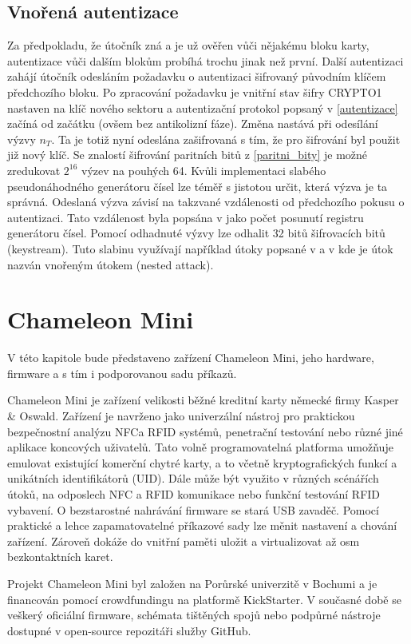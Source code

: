 \section{Vnořená autentizace}
Za předpokladu, že útočník zná a je už ověřen vůči nějakému bloku karty, autentizace vůči dalším blokům probíhá trochu jinak než první. Další autentizaci zahájí útočník odesláním požadavku o autentizaci šifrovaný původním klíčem předchozího bloku. Po zpracování požadavku je vnitřní stav šifry CRYPTO1 nastaven na klíč nového sektoru a autentizační protokol popsaný v \ref{autentizace} začíná od začátku (ovšem bez antikolizní fáze). Změna nastává při odesílání výzvy $n_T$. Ta je totiž nyní odeslána zašifrovaná s tím, že pro šifrování byl použit již nový klíč. Se znalostí šifrování paritních bitů z \ref{paritni_bity} je možné zredukovat $2^16$ výzev na pouhých 64. Kvůli implementaci slabého pseudonáhodného generátoru čísel lze téměř s jistotou určit, která výzva je ta správná. Odeslaná výzva závisí na takzvané vzdálenosti od předchozího pokusu o autentizaci. Tato vzdálenost byla popsána v \cite{Dismantling_Mifare_Classic} jako počet posunutí registru generátoru čísel. Pomocí odhadnuté výzvy lze odhalit 32 bitů šifrovacích bitů (keystream)\cite{Dismantling_Mifare_Classic}.
Tuto slabinu využívají například útoky popsané v \cite{Cryptanalisis} a v \cite{Wirelessly_Pickpocketing} kde je útok nazván vnořeným útokem (nested attack).

\chapter{Chameleon Mini}
\label{chameleon_mini}

V této kapitole bude představeno zařízení Chameleon Mini, jeho hardware, firmware a s tím i podporovanou sadu příkazů.

\par

Chameleon Mini je zařízení velikosti běžné kreditní karty německé firmy Kasper \& Oswald.  Zařízení je navrženo jako univerzální nástroj pro praktickou bezpečnostní analýzu NFC\footnotemark a RFID systémů, penetrační testování nebo různé jiné aplikace koncových uživatelů. Tato volně programovatelná platforma umožňuje emulovat existující komerční chytré karty, a to včetně kryptografických funkcí a unikátních identifikátorů (UID). Dále může být využito v různých scénářích útoků, na odposlech NFC a RFID komunikace nebo funkční testování RFID vybavení. O bezstarostné nahrávání firmware se stará USB zavaděč. Pomocí praktické a lehce zapamatovatelné příkazové sady lze měnit nastavení a chování zařízení. Zároveň dokáže do vnitřní paměti uložit a virtualizovat až osm bezkontaktních karet.\cite{ChameleonKickStarter} 
\par 
Projekt Chameleon Mini byl založen na Porůrské univerzitě v Bochumi a je financován pomocí crowdfundingu na platformě KickStarter. V současné době se veškerý oficiální firmware, schémata tištěných spojů nebo podpůrné nástroje dostupné v {open-source} repozitáři služby GitHub\footnotemark.\cite{ChameleonDocs}

